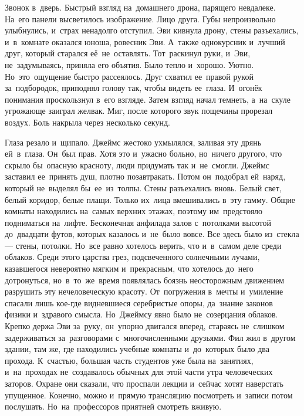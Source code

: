 Звонок в~дверь.
Быстрый взгляд на~домашнего дрона, парящего невдалеке.
На~его панели высветилось изображение.
Лицо друга.
Губы непроизвольно улыбнулись, и~страх ненадолго отступил.
Эви кивнула дрону, стены разъехались, и~в~комнате оказался юноша, ровесник Эви.
А~также однокурсник и~лучший друг, который старался её~не~оставлять.
Тот~раскинул руки, и~Эви, не~задумываясь, приняла его объятия.
Было тепло и~хорошо.
Уютно.
Но~это~ощущение быстро рассеялось.
Друг схватил ее~правой рукой за~подбородок, приподнял голову так, чтобы видеть ее~глаза.
И~огонёк понимания проскользнул в~его взгляде.
Затем взгляд начал темнеть, а~на~скуле угрожающе заиграл желвак.
Миг, после которого звук пощечины прорезал воздух.
Боль накрыла через несколько секунд.

Глаза резало и~щипало.
Джеймс жестоко ухмылялся, заливая эту дрянь ей~в~глаза.
Он~был прав.
Хотя это и~ужасно больно, но~ничего другого, что скрыло бы~опасную красноту, люди придумать так и~не~смогли.
Джеймс заставил ее~принять душ, плотно позавтракать.
Потом он~подобрал ей~наряд, который не~выделял бы~ее~из~толпы.
Стены разъехались вновь.
Белый свет, белый коридор, белые плащи.
Только их~лица вмешивались в~эту гамму.
Общие комнаты находились на~самых верхних этажах, поэтому им~предстояло подниматься на~лифте.
Бесконечная анфилада залов с~потолками высотой до~двадцати футов, которых казалось и~не~было вовсе.
Все здесь было из~стекла --- стены, потолки.
Но~все равно хотелось верить, что и~в~самом деле среди облаков.
Среди этого царства грез, подсвеченного солнечными лучами, казавшегося невероятно мягким и~прекрасным, что хотелось до~него дотронуться, но~в~то~же~время появлялась боязнь неосторожным движением разрушить эту нечеловеческую красоту.
От~погружения в~мечты и~умиление спасали лишь кое-где видневшиеся серебристые опоры, да~знание законов физики и~здравого смысла.
Но~Джеймсу явно было не~созерцания облаков.
Крепко держа Эви за~руку, он~упорно двигался вперед, стараясь не~слишком задерживаться за~разговорами с~многочисленными друзьями.
Фил жил в~другом здании, там же, где находились учебные комнаты и~до~которых было два прохода.
К~счастью, большая часть студентов уже была на~занятиях, и~на~проходах не~создавалось обычных для этой части утра человеческих заторов.
Охране они сказали, что проспали лекции и~сейчас хотят наверстать упущенное.
Конечно, можно и~прямую трансляцию посмотреть и~записи потом послушать.
Но~на~профессоров приятней смотреть вживую.
 
